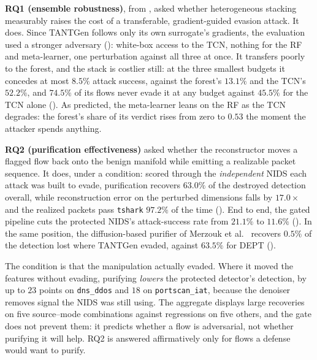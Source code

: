 \textbf{RQ1 (ensemble robustness)}, from , asked whether heterogeneous stacking
measurably raises the cost of a transferable, gradient-guided evasion attack. It does. Since
TANTGen follows only its own surrogate's gradients, the evaluation used a stronger adversary ():
white-box access to the \ac{TCN}, nothing for the \ac{RF} and meta-learner, one perturbation against
all three at once. It transfers poorly to the forest, and the stack is costlier still: at the
three smallest budgets it concedes at most $8.5\%$ attack success, against the forest's $13.1\%$
and the \ac{TCN}'s $52.2\%$, and $74.5\%$ of its flows never evade it at any budget against
$45.5\%$ for the \ac{TCN} alone (). As predicted, the meta-learner
leans on the \ac{RF} as the \ac{TCN} degrades: the forest's share of its verdict rises from zero to
$0.53$ the moment the attacker spends anything.

\textbf{RQ2 (purification effectiveness)} asked whether the reconstructor moves a flagged flow
back onto the benign manifold while emitting a realizable packet sequence. It does, under a
condition: scored through the \emph{independent} \ac{NIDS} each attack was built to evade,
purification recovers $63.0\%$ of the destroyed detection overall, while reconstruction error on the
perturbed dimensions falls by $17.0\times$ and the realized packets pass \texttt{tshark} $97.2\%$
of the time (). End to end, the gated pipeline cuts the protected
\ac{NIDS}'s attack-success rate from $21.1\%$ to $11.6\%$ (). In the same
position, the diffusion-based purifier of Merzouk et al.~\cite{merzouk2024diffusion} recovers $0.5\%$ of
the detection lost where TANTGen evaded, against $63.5\%$ for DEPT ().

The condition is that the manipulation actually evaded. Where it moved the features without evading,
purifying \emph{lowers} the protected detector's detection, by up to $23$ points on
\texttt{dns\_ddos} and $18$ on \texttt{portscan\_iat}, because the denoiser removes signal the
\ac{NIDS} was still using. The aggregate displays large recoveries on five source--mode combinations
against regressions on five others, and the gate does not prevent them: it predicts whether a flow
is adversarial, not whether purifying it will help. RQ2 is answered affirmatively only for flows a
defense would want to purify.

